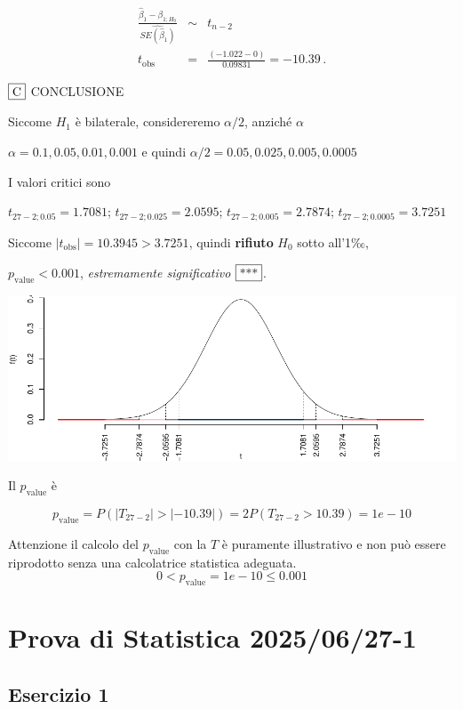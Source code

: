\documentclass[
  11pt,
]{book}
\theoremstyle{mytheoremstyle}
\theoremstyle{mydefstyle}
\begin{document}
\begin{eqnarray*}
 \frac{\hat\beta_{ 1 } - \beta_{ 1 ;H_0}} {\widehat{SE(\hat\beta_{ 1 })}}&\sim&t_{n-2}\\
   t_{\text{obs}}
&=& \frac{ ( -1.022 -  0 )} { 0.09831 }
 =   -10.39 \, .
\end{eqnarray*}

\(\fbox{C}\) CONCLUSIONE

Siccome \(H_1\) è bilaterale, considereremo \(\alpha/2\),
anziché \(\alpha\)

\(\alpha=0.1, 0.05, 0.01, 0.001\) e quindi \(\alpha/2=0.05, 0.025, 0.005, 0.0005\)

I valori critici sono

\(t_{27-2;0.05}=1.7081\); \(t_{27-2;0.025}=2.0595\); \(t_{27-2;0.005}=2.7874\); \(t_{27-2;0.0005}=3.7251\)

Siccome \(|t_\text{obs}|=10.3945>3.7251\), quindi \textbf{rifiuto} \(H_0\) sotto all'1‰,

\(p_\text{value}<0.001\), \emph{estremamente significativo} \(\fbox{***}\).

\begin{center}\includegraphics{Esami_passati_con_soluzioni_files/figure-latex/unnamed-chunk-57-1} \end{center}

Il \(p_{\text{value}}\) è

\[ p_{\text{value}} = P(|T_{27-2}|>|-10.39|)=2P(T_{27-2}>10.39)=1e-10 \]

Attenzione il calcolo del \(p_\text{value}\) con la \(T\) è puramente illustrativo e non può essere riprodotto senza una calcolatrice statistica adeguata.\[
 0 < p_\text{value}= 1e-10 \leq 0.001 
\]

\section{Prova di Statistica 2025/06/27-1}\label{prova-di-statistica-20250627-1}

\subsection{Esercizio 1}\label{esercizio-1-46}
\end{document}
